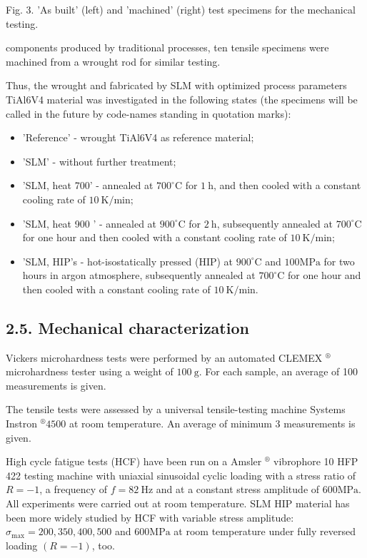 \documentclass[10pt]{article}
\begin{document}
Fig. 3. 'As built' (left) and 'machined' (right) test specimens for the mechanical testing.

components produced by traditional processes, ten tensile specimens were machined from a wrought rod for similar testing.

Thus, the wrought and fabricated by SLM with optimized process parameters TiAl6V4 material was investigated in the following states (the specimens will be called in the future by code-names standing in quotation marks):

\begin{itemize}
  \item 'Reference' - wrought TiAl6V4 as reference material;

  \item 'SLM' - without further treatment;

  \item 'SLM, heat 700' - annealed at $700^{\circ} \mathrm{C}$ for $1 \mathrm{~h}$, and then cooled with a constant cooling rate of $10 \mathrm{~K} / \mathrm{min}$;

  \item 'SLM, heat 900 ' - annealed at $900^{\circ} \mathrm{C}$ for $2 \mathrm{~h}$, subsequently annealed at $700^{\circ} \mathrm{C}$ for one hour and then cooled with a constant cooling rate of $10 \mathrm{~K} / \mathrm{min}$;

  \item 'SLM, HIP's - hot-isostatically pressed (HIP) at $900^{\circ} \mathrm{C}$ and $100 \mathrm{MPa}$ for two hours in argon atmosphere, subsequently annealed at $700^{\circ} \mathrm{C}$ for one hour and then cooled with a constant cooling rate of $10 \mathrm{~K} / \mathrm{min}$.

\end{itemize}

\subsection*{2.5. Mechanical characterization}
Vickers microhardness tests were performed by an automated CLEMEX $^{\circledR}$ microhardness tester using a weight of $100 \mathrm{~g}$. For each sample, an average of 100 measurements is given.

The tensile tests were assessed by a universal tensile-testing machine Systems Instron ${ }^{\circledR} 4500$ at room temperature. An average of minimum 3 measurements is given.

High cycle fatigue tests (HCF) have been run on a Amsler ${ }^{\circledR}$ vibrophore 10 HFP 422 testing machine with uniaxial sinusoidal cyclic loading with a stress ratio of $R=-1$, a frequency of $f=82 \mathrm{~Hz}$ and at a constant stress amplitude of $600 \mathrm{MPa}$. All experiments were carried out at room temperature. SLM HIP material has been more widely studied by HCF with variable stress amplitude: $\sigma_{\max }=200,350,400,500$ and $600 \mathrm{MPa}$ at room temperature under fully reversed loading $(R=-1)$, too.
\end{document}
